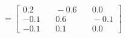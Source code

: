\documentclass[preview]{standalone}
\begin{document}
\begin{align*}
=\begin{bmatrix} 0.2 & \quad -0.6 & \quad 0.0 \\ -0.1 & \quad 0.6 & \quad -0.1 \\ -0.1 & \quad 0.1 & \quad 0.0 \end{bmatrix}
\end{align*}
\end{document}
